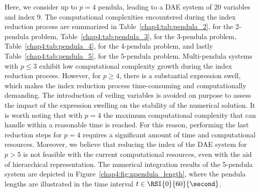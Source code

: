 Here, we consider up to $p = 4$ pendula, leading to a \ac{DAE} system of $20$ variables and index $9$. The computational complexities encountered during the index reduction process are summarized in Table~\ref{chap4:tab:pendula_2}, for the 2-pendula problem, Table~\ref{chap4:tab:pendula_3}, for the 3-pendula problem, Table~\ref{chap4:tab:pendula_4}, for the 4-pendula problem, and lastly Table~\ref{chap4:tab:pendula_5}, for the 5-pendula problem. Multi-pendula systems with $p \leq 3$ exhibit low computational complexity growth during the index reduction process. However, for $p \geq 4$, there is a substantial expression swell, which makes the index reduction process time-consuming and computationally demanding.
The introduction of veiling variables is avoided on purpose to assess the impact of the expression swelling on the stability of the numerical solution.
It is worth noting that with $p = 4$ the maximum computational complexity that \Maple{} can handle within a reasonable time is reached. For this reason, performing the last reduction steps for $p = 4$ requires a significant amount of time and computational resources. Moreover, we believe that reducing the index of the \ac{DAE} system for $p > 5$ is not feasible with the current computational resources, even with the aid of hierarchical representation. The numerical integration results of the 5-pendula system are depicted in Figure~\ref{chap4:fig:npendula_length}, where the pendula lengths are illustrated in the time interval $t \in \RSI{0}{60}{\second}$.


